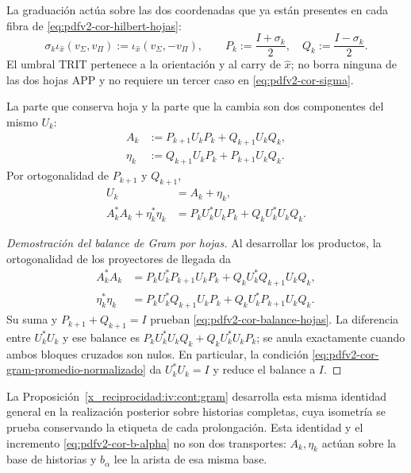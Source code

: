 La graduación actúa sobre las dos coordenadas que ya están presentes en cada
fibra de \eqref{eq:pdfv2-cor-hilbert-hojas}:
\begin{equation}
\label{eq:pdfv2-cor-sigma}
 \sigma_k\iota_{\widehat x}(v_\Sigma,v_\Pi)
 :=\iota_{\widehat x}(v_\Sigma,-v_\Pi),
\qquad
 P_k:=\frac{I+\sigma_k}{2},\quad
 Q_k:=\frac{I-\sigma_k}{2}.
\end{equation}
El umbral TRIT pertenece a la orientación y al carry de
\(\widehat x\); no borra ninguna de las dos hojas APP y no requiere un tercer
caso en \eqref{eq:pdfv2-cor-sigma}.

La parte que conserva hoja y la parte que la cambia son dos componentes del
mismo \(U_k\):
\begin{align}
 A_k&:=P_{k+1}U_kP_k+Q_{k+1}U_kQ_k,
 \label{eq:pdfv2-cor-a-comun}\\
 \eta_k&:=Q_{k+1}U_kP_k+P_{k+1}U_kQ_k.
 \label{eq:pdfv2-cor-eta-comun}
\end{align}
Por ortogonalidad de \(P_{k+1}\) y \(Q_{k+1}\),
\begin{equation}
\label{eq:pdfv2-cor-balance-hojas}
 \begin{aligned}
 U_k&=A_k+\eta_k,\\
 A_k^*A_k+\eta_k^*\eta_k
 &=P_kU_k^*U_kP_k+Q_kU_k^*U_kQ_k.
 \end{aligned}
\end{equation}
\begin{proof}[Demostración del balance de Gram por hojas]
Al desarrollar los productos, la ortogonalidad de los proyectores de
llegada da
\[
\begin{aligned}
 A_k^*A_k
 &=P_kU_k^*P_{k+1}U_kP_k+Q_kU_k^*Q_{k+1}U_kQ_k,\\
 \eta_k^*\eta_k
 &=P_kU_k^*Q_{k+1}U_kP_k+Q_kU_k^*P_{k+1}U_kQ_k.
\end{aligned}
\]
Su suma y \(P_{k+1}+Q_{k+1}=I\) prueban
\eqref{eq:pdfv2-cor-balance-hojas}. La diferencia entre \(U_k^*U_k\)
y ese balance es
\(P_kU_k^*U_kQ_k+Q_kU_k^*U_kP_k\); se anula exactamente cuando
ambos bloques cruzados son nulos. En particular, la condición
\eqref{eq:pdfv2-cor-gram-promedio-normalizado} da \(U_k^*U_k=I\)
y reduce el balance a \(I\).
\end{proof}
La Proposición~\ref{x_reciprocidad:iv:cont:gram} desarrolla esta misma
identidad general en la realización posterior sobre historias completas,
cuya isometría se prueba conservando la etiqueta de cada prolongación.
Esta identidad y el incremento \eqref{eq:pdfv2-cor-b-alpha} no son dos
transportes: \(A_k,\eta_k\) actúan sobre la base de historias y
\(b_\alpha\) lee la arista de esa misma base.

